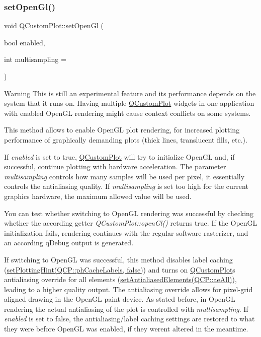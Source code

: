 \subsubsection{\texorpdfstring{set\+Open\+Gl()}{setOpenGl()}}
{\footnotesize\ttfamily void Q\+Custom\+Plot\+::set\+Open\+Gl (\begin{DoxyParamCaption}\item[{bool}]{enabled,  }\item[{int}]{multisampling = {} }\end{DoxyParamCaption})}

\begin{DoxyWarning}{Warning}
This is still an experimental feature and its performance depends on the system that it runs on. Having multiple \hyperlink{classQCustomPlot}{Q\+Custom\+Plot} widgets in one application with enabled Open\+GL rendering might cause context conflicts on some systems.
\end{DoxyWarning}
This method allows to enable Open\+GL plot rendering, for increased plotting performance of graphically demanding plots (thick lines, translucent fills, etc.).

If {\itshape enabled} is set to true, \hyperlink{classQCustomPlot}{Q\+Custom\+Plot} will try to initialize Open\+GL and, if successful, continue plotting with hardware acceleration. The parameter {\itshape multisampling} controls how many samples will be used per pixel, it essentially controls the antialiasing quality. If {\itshape multisampling} is set too high for the current graphics hardware, the maximum allowed value will be used.

You can test whether switching to Open\+GL rendering was successful by checking whether the according getter {\itshape Q\+Custom\+Plot\+::open\+Gl()} returns true. If the Open\+GL initialization fails, rendering continues with the regular software rasterizer, and an according q\+Debug output is generated.

If switching to Open\+GL was successful, this method disables label caching (\hyperlink{classQCustomPlot_a3b7c97bb6c16464e9e15190c07abe9a9}{set\+Plotting\+Hint(Q\+CP\+:\+:ph\+Cache\+Labels, false)}) and turns on \hyperlink{classQCustomPlot}{Q\+Custom\+Plot}\textquotesingle{}s antialiasing override for all elements (\hyperlink{classQCustomPlot_af6f91e5eab1be85f67c556e98c3745e8}{set\+Antialiased\+Elements(Q\+CP\+:\+:ae\+All)}), leading to a higher quality output. The antialiasing override allows for pixel-\/grid aligned drawing in the Open\+GL paint device. As stated before, in Open\+GL rendering the actual antialiasing of the plot is controlled with {\itshape multisampling}. If {\itshape enabled} is set to false, the antialiasing/label caching settings are restored to what they were before Open\+GL was enabled, if they weren\textquotesingle{}t altered in the meantime.

